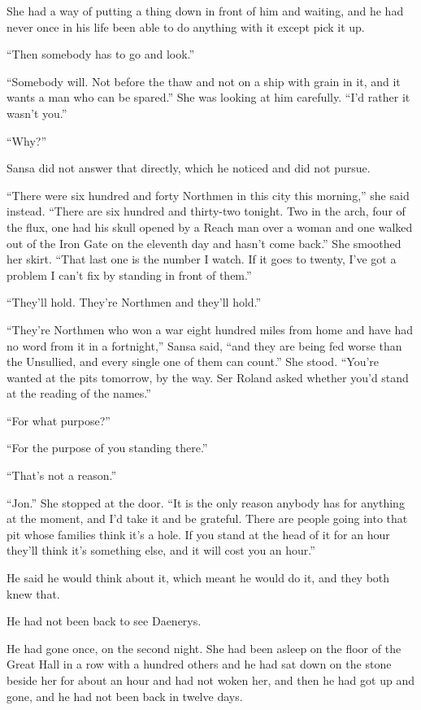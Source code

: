She had a way of putting a thing down in front of him and waiting, and he had never once in his life been able to do anything with it except pick it up.

“Then somebody has to go and look.”

“Somebody will. Not before the thaw and not on a ship with grain in it, and it wants a man who can be spared.” She was looking at him carefully. “I’d rather it wasn’t you.”

“Why?”

Sansa did not answer that directly, which he noticed and did not pursue.

“There were six hundred and forty Northmen in this city this morning,” she said instead. “There are six hundred and thirty-two tonight. Two in the arch, four of the flux, one had his skull opened by a Reach man over a woman and one walked out of the Iron Gate on the eleventh day and hasn’t come back.” She smoothed her skirt. “That last one is the number I watch. If it goes to twenty, I’ve got a problem I can’t fix by standing in front of them.”

“They’ll hold. They’re Northmen and they’ll hold.”

“They’re Northmen who won a war eight hundred miles from home and have had no word from it in a fortnight,” Sansa said, “and they are being fed worse than the Unsullied, and every single one of them can count.” She stood. “You’re wanted at the pits tomorrow, by the way. Ser Roland asked whether you’d stand at the reading of the names.”

“For what purpose?”

“For the purpose of you standing there.”

“That’s not a reason.”

“Jon.” She stopped at the door. “It is the only reason anybody has for anything at the moment, and I’d take it and be grateful. There are people going into that pit whose families think it’s a hole. If you stand at the head of it for an hour they’ll think it’s something else, and it will cost you an hour.”

He said he would think about it, which meant he would do it, and they both knew that.

\sceneBreak

He had not been back to see Daenerys.

He had gone once, on the second night. She had been asleep on the floor of the Great Hall in a row with a hundred others and he had sat down on the stone beside her for about an hour and had not woken her, and then he had got up and gone, and he had not been back in twelve days.

